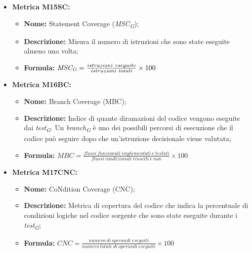 \begin{itemize}
          \item \hypertarget{item:M15SC}{\textbf{Metrica M15SC:}}
          \begin{minipage}[t]{0.9\textwidth}
          \begin{itemize}
              \item \textbf{Nome:} Statement Coverage (\textit{MSC}\textsubscript{\textit{G}});
              \item \textbf{Descrizione:} Misura il numero di istruzioni che sono state eseguite almeno una volta;
              \item \textbf{Formula:} $\textit{MSC}\textsubscript{\textit{G}} = \frac{istruzioni \ eseguite}{istruzioni \ totali} \times 100$
          \end{itemize}
          \end{minipage}

          \item \hypertarget{item:M16BC}{\textbf{Metrica M16BC:}}
          \begin{minipage}[t]{0.9\textwidth}
          \begin{itemize}
              \item \textbf{Nome:} Branch Coverage (MBC);
              \item \textbf{Descrizione:} Indice di quante diramazioni del codice vengono eseguite dai \textit{test}\textsubscript{\textit{G}}. Un \textit{branch}\textsubscript{\textit{G}} è uno dei possibili percorsi di esecuzione che il codice può seguire dopo che un'istruzione decisionale viene valutata;
              \item \textbf{Formula:} $MBC = \frac{flussi \ funzionali \ implementati \ e \ testati}{flussi \ condizionali \ riusciti \ e \ non} \times 100$
          \end{itemize}
        \end{minipage}

          \item \hypertarget{item:M17CNC}{\textbf{Metrica M17CNC:}}
          \begin{minipage}[t]{0.9\textwidth}
          \begin{itemize}
              \item \textbf{Nome:} CoNdition Coverage (CNC);
              \item \textbf{Descrizione:} Metrica di copertura del codice che indica la percentuale di condizioni logiche nel codice sorgente che sono state eseguite durante i \textit{test}\textsubscript{\textit{G}};
              \item \textbf{Formula:} $CNC = \frac{numero \ di \ operandi \ eseguiti}{numero \ totale \ di \ operandi \ eseguiti} \times 100$
          \end{itemize}
        \end{minipage}
\end{itemize}